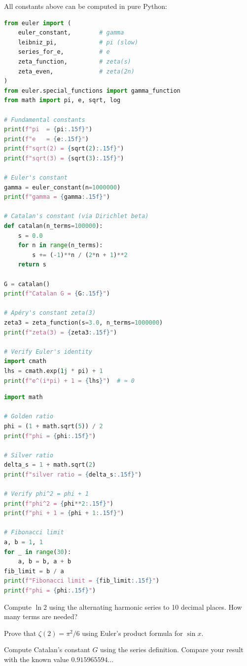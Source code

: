All constants above can be computed in pure Python:

\begin{lstlisting}[language=Python, caption=Computing mathematical constants]
from euler import (
    euler_constant,        # gamma
    leibniz_pi,            # pi (slow)
    series_for_e,          # e
    zeta_function,         # zeta(s)
    zeta_even,             # zeta(2n)
)
from euler.special_functions import gamma_function
from math import pi, e, sqrt, log

# Fundamental constants
print(f"pi  = {pi:.15f}")
print(f"e   = {e:.15f}")
print(f"sqrt(2) = {sqrt(2):.15f}")
print(f"sqrt(3) = {sqrt(3):.15f}")

# Euler's constant
gamma = euler_constant(n=1000000)
print(f"gamma = {gamma:.15f}")

# Catalan's constant (via Dirichlet beta)
def catalan(n_terms=100000):
    s = 0.0
    for n in range(n_terms):
        s += (-1)**n / (2*n + 1)**2
    return s

G = catalan()
print(f"Catalan G = {G:.15f}")

# Apéry's constant zeta(3)
zeta3 = zeta_function(s=3.0, n_terms=1000000)
print(f"zeta(3) = {zeta3:.15f}")

# Verify Euler's identity
import cmath
lhs = cmath.exp(1j * pi) + 1
print(f"e^(i*pi) + 1 = {lhs}")  # ≈ 0
\end{lstlisting}

\begin{lstlisting}[language=Python, caption=Golden ratio and metallic means]
import math

# Golden ratio
phi = (1 + math.sqrt(5)) / 2
print(f"phi = {phi:.15f}")

# Silver ratio
delta_s = 1 + math.sqrt(2)
print(f"silver ratio = {delta_s:.15f}")

# Verify phi^2 = phi + 1
print(f"phi^2 = {phi**2:.15f}")
print(f"phi + 1 = {phi + 1:.15f}")

# Fibonacci limit
a, b = 1, 1
for _ in range(30):
    a, b = b, a + b
fib_limit = b / a
print(f"Fibonacci limit = {fib_limit:.15f}")
print(f"phi = {phi:.15f}")
\end{lstlisting}

\begin{exercise}
Compute $\ln 2$ using the alternating harmonic series to 10 decimal places. How many terms are needed?
\end{exercise}

\begin{exercise}
Prove that $\zeta(2) = \pi^2/6$ using Euler's product formula for $\sin x$.
\end{exercise}

\begin{exercise}
Compute Catalan's constant $G$ using the series definition. Compare your result with the known value $0.915965594\dots$
\end{exercise}
